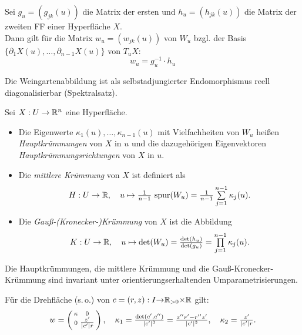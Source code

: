 \documentclass{cheat-sheet}
\begin{document}

\begin{satz}
  Sei $g_u = (g_{jk}(u))$ die Matrix der ersten und $h_u = (h_{jk}(u))$ die Matrix der zweiten FF einer Hyperfläche $X$. \\
  Dann gilt für die Matrix $w_u = (w_{jk}(u))$ von $W_u$ bzgl. der Basis $\{ \partial_1 X(u), \ldots, \partial_{n-1} X(u) \}$ von $T_u X$:
  \[ w_u = g_u^{-1} \cdot h_u \]
\end{satz}

\begin{bem}
  Die Weingartenabbildung ist als selbstadjungierter Endomorphismus reell diagonalisierbar (Spektralsatz).
\end{bem}

\begin{defn}
  Sei $X : U \to \mathbb{R}^n$ eine Hyperfläche.
  \begin{itemize}
    \item Die Eigenwerte $\kappa_1(u), \ldots, \kappa_{n-1}(u)$ mit Vielfachheiten von $W_u$ heißen \emph{Hauptkrümmungen} von $X$ in $u$ und die dazugehörigen Eigenvektoren \emph{Hauptkrümmungsrichtungen} von $X$ in $u$.
    \item Die \emph{mittlere Krümmung} von $X$ ist definiert als
    \[ H : U \to \R, \quad u \mapsto \tfrac{1}{n-1} \, \spur(W_u) = \tfrac{1}{n-1} \sum_{j=1}^{n-1} \kappa_j(u). \]
    \item Die \emph{Gauß-(Kronecker-)Krümmung} von $X$ ist die Abbildung
    \[ K : U \to \R, \quad u \mapsto \det(W_u) = \tfrac{\det(h_u)}{\det(g_u)} = \prod_{j=1}^{n-1} \kappa_j(u). \]
  \end{itemize}
\end{defn}

\begin{satz}
  Die Hauptkrümmungen, die mittlere Krümmung und die Gauß-Kronecker-Krümmung sind invariant unter orientierungserhaltenden Umparametrisierungen.
\end{satz}

\begin{bsp}
  Für die Drehfläche (s.\,o.) von $c = (r, z) : I {\to} \mathbb{R}_{>0} {\times} \mathbb{R}$ gilt:
  \[
    w = \left( \begin{smallmatrix} \kappa & 0 \\ 0 & \tfrac{z'}{\lvert c'\rvert r} \end{smallmatrix} \right), \quad
    \kappa_1 = \tfrac{\det(c', c'')}{\lvert c'\rvert^3} = \tfrac{z'' r' - r'' z'}{\lvert c'\rvert^3}, \quad
    \kappa_2 = \tfrac{z'}{\lvert c'\rvert r}.
  \]
\end{bsp}
\end{document}
